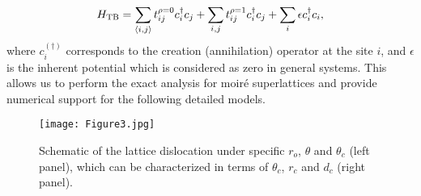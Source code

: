 \documentclass[%
reprint,
amsmath,amssymb,amsfonts
aps,
superscriptaddress,
prx
]{revtex4-1}
\begin{document}
\begin{equation}
\begin{split}
H_{\rm TB}=\sum_{\langle i,j \rangle}t_{ij}^{\rho=0}c_{i}^{\dagger}c_j+\sum_{i,j}t_{ij}^{\rho=1}c_{i}^{\dagger}c_j+\sum_{i}\epsilon c_{i}^{\dagger}c_{i}, 
\end{split}
\label{eq:2}
\end{equation}
where $c_i^{(\dagger)}$ corresponds to the creation (annihilation) operator at the site $i$, and $\epsilon$ is the inherent potential which is considered as zero in general systems. This allows us to perform the exact analysis for moir\'e superlattices and provide numerical support for the following detailed models. 
\begin{figure}
\texttt{[image: Figure3.jpg]}%
\caption{Schematic of the lattice dislocation under specific $r_o$, $\theta$ and $\theta_c$ (left panel), which can be characterized in terms of $\theta_c$, $r_c$ and $d_c$ (right panel).} 
\label{fig:3}
\end{figure}%
\end{document}
